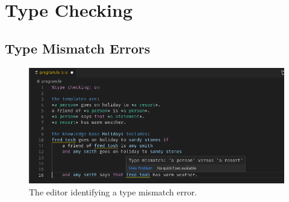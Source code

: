 \documentclass[../main.tex]{subfiles}
\begin{document}
\section{Type Checking}
\subsection{Type Mismatch Errors}
\begin{figure}[h!]
\centering
\includegraphics[width = \linewidth]{figures/type-error.png}
\caption{The editor identifying a type mismatch error.}
\label{fig:type-mismatch}
\end{figure}
\end{document}
